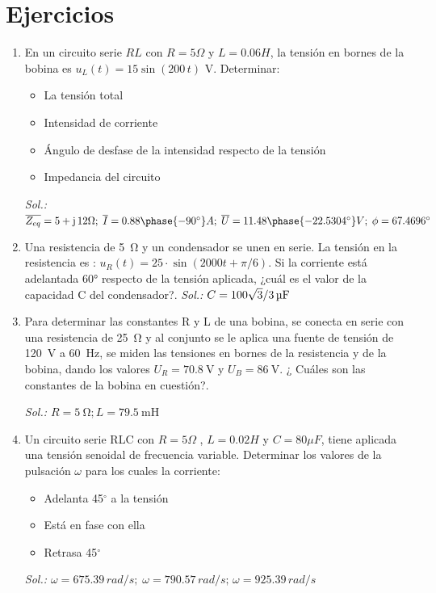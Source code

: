 \section*{Ejercicios}
	
\begin{enumerate}
		
\item En un circuito serie $RL$ con $R=5\Omega$ y $L=0.06H$, la
  tensión en bornes de la bobina es $u_L(t)=15\sin(200\,t)$
  V. Determinar:
  \begin{itemize}
  \item La tensión total
  \item Intensidad de corriente
  \item Ángulo de desfase de la intensidad respecto de la tensión
  \item Impedancia del circuito
  \end{itemize}
  \emph{Sol.:
    $\overline{Z_{eq}}=5+\mathrm{j}\,12\Omega;\;\overline{I}=0.88\phase{-90^\circ}A;\;\overline{U}=11.48\phase{-22.5304^\circ}
    V;\; \phi=67.4696^\circ$}

\item Una resistencia de \qty{5}{\ohm} y un condensador se unen en
  serie. La tensión en la resistencia es :
  $u_R(t) = 25 \cdot \sin(2000t + \pi/6)$. Si la corriente está
  adelantada \ang{60} respecto de la tensión aplicada, ¿cuál es el
  valor de la capacidad C del condensador?.  \emph{Sol.:
    $C = \SI[parse-numbers = false]{100\sqrt{3}/3}{\micro\farad}$}
  

\item Para determinar las constantes R y L de una bobina, se conecta
  en serie con una resistencia de \qty{25}{\ohm} y al conjunto se le
  aplica una fuente de tensión de \qty{120}{\volt} a \qty{60}{\hertz},
  se miden las tensiones en bornes de la resistencia y de la bobina,
  dando los valores $U_R = \qty{70.8}{\volt}$ y
  $U_B = \qty{86}{\volt}$. ¿ Cuáles son las constantes de la bobina en
  cuestión?.

  \emph{Sol.: $R = \qty{5}{\ohm}; L = \qty{79.5}{\milli\henry}$}

\item Un circuito serie RLC con $R = {5}{\Omega}$ , $L = {0.02}{H}$ y
  $C={80}{\mu F}$, tiene aplicada una tensión senoidal de frecuencia
  variable. Determinar los valores de la pulsación $\omega$ para los
  cuales la corriente:
  \begin{itemize}
  \item Adelanta {45}{$^\circ$} a la tensión
  \item Está en fase con ella
  \item Retrasa {45}{$^\circ$}
  \end{itemize}
  \emph{Sol.:
    $\omega=675.39\,rad/s;\; \omega=790.57\,rad/s;\,
    \omega=925.39\,rad/s$}


\end{enumerate}
